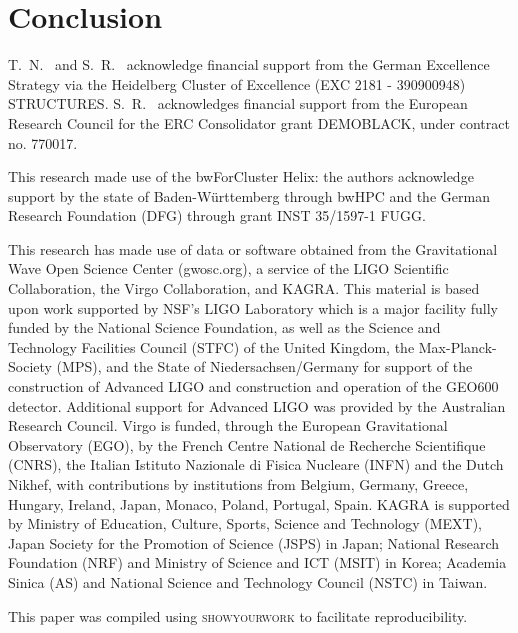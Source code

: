 \documentclass[aps,prd,twocolumn,superscriptaddress,preprintnumbers,nofootinbib,hidelinks]{revtex4-2}
\begin{document}
\section{Conclusion}
\label{sec:conclusion}

\begin{acknowledgments}
T.~N.~ and S.~R.~ acknowledge financial support from the German Excellence Strategy via the Heidelberg Cluster of Excellence (EXC 2181 - 390900948) STRUCTURES.
S.~R.~ acknowledges financial support from the European Research Council for the ERC Consolidator grant DEMOBLACK, under contract no. 770017. 

This research made use of the bwForCluster Helix: the authors acknowledge support by the state of Baden-Württemberg through bwHPC and the German Research Foundation (DFG) through grant INST 35/1597-1 FUGG.

This research has made use of data or software obtained from the Gravitational Wave Open Science Center (gwosc.org), a service of the LIGO Scientific Collaboration, the Virgo Collaboration, and KAGRA. This material is based upon work supported by NSF's LIGO Laboratory which is a major facility fully funded by the National Science Foundation, as well as the Science and Technology Facilities Council (STFC) of the United Kingdom, the Max-Planck-Society (MPS), and the State of Niedersachsen/Germany for support of the construction of Advanced LIGO and construction and operation of the GEO600 detector. Additional support for Advanced LIGO was provided by the Australian Research Council. Virgo is funded, through the European Gravitational Observatory (EGO), by the French Centre National de Recherche Scientifique (CNRS), the Italian Istituto Nazionale di Fisica Nucleare (INFN) and the Dutch Nikhef, with contributions by institutions from Belgium, Germany, Greece, Hungary, Ireland, Japan, Monaco, Poland, Portugal, Spain. KAGRA is supported by Ministry of Education, Culture, Sports, Science and Technology (MEXT), Japan Society for the Promotion of Science (JSPS) in Japan; National Research Foundation (NRF) and Ministry of Science and ICT (MSIT) in Korea; Academia Sinica (AS) and National Science and Technology Council (NSTC) in Taiwan.

This paper was compiled using \textsc{showyourwork} \cite{Luger2021} to facilitate reproducibility.

\end{acknowledgments}


\end{document}
